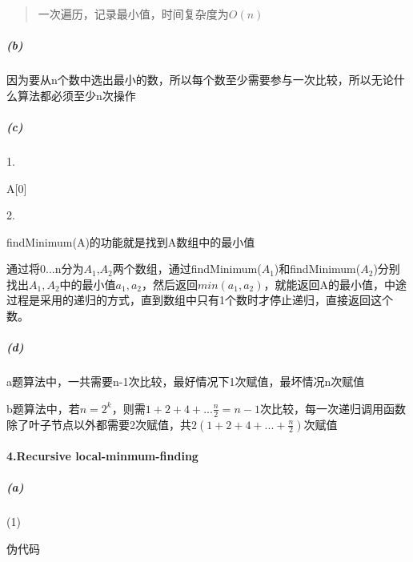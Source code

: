 \documentclass[
]{article}
\begin{document}
\begin{quote}
一次遍历，记录最小值，时间复杂度为\(O(n)\)
\end{quote}

\hypertarget{header-n40}{%
\subparagraph{(b)}\label{header-n40}}

因为要从n个数中选出最小的数，所以每个数至少需要参与一次比较，所以无论什么算法都必须至少n次操作

\hypertarget{header-n42}{%
\subparagraph{(c)}\label{header-n42}}

1.

A{[}0{]}

2.

findMinimum(A)的功能就是找到A数组中的最小值

通过将0...n分为\(A_1\),\(A_2\)两个数组，通过findMinimum(\(A_1\))和findMinimum(\(A_2\))分别找出\(A_1,A_2\)中的最小值\(a_1,a_2\)，然后返回\(min(a_1,a_2)\)，就能返回A的最小值，中途过程是采用的递归的方式，直到数组中只有1个数时才停止递归，直接返回这个数。

\hypertarget{header-n49}{%
\subparagraph{(d)}\label{header-n49}}

a题算法中，一共需要n-1次比较，最好情况下1次赋值，最坏情况n次赋值

b题算法中，若\(n=2^k\)，则需\(1+2+4+...\frac{n}{2}=n-1\)次比较，每一次递归调用函数除了叶子节点以外都需要2次赋值，共\(2(1+2+4+...+\frac{n}{2})\)次赋值

\hypertarget{header-n53}{%
\paragraph{4.Recursive local-minmum-finding}\label{header-n53}}

\hypertarget{header-n54}{%
\subparagraph{(a)}\label{header-n54}}

(1)

伪代码
\end{document}
